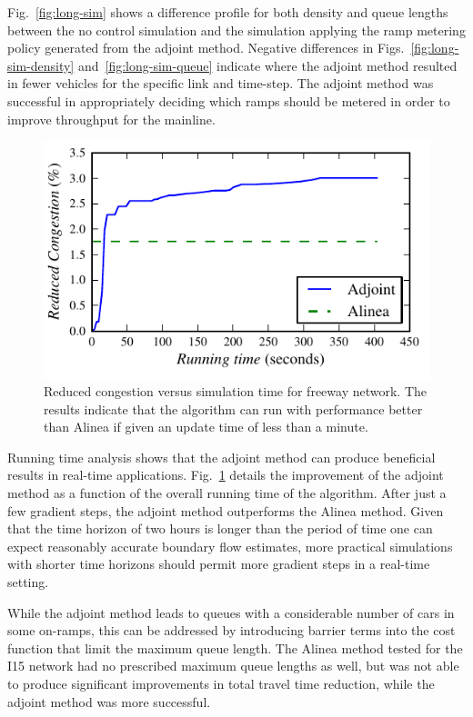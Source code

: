 						
Fig.~\ref{fig:long-sim} shows a difference profile for both density and queue lengths between the
no control simulation and the simulation applying the ramp metering
policy generated from the adjoint method. Negative differences in
Figs.~\ref{fig:long-sim-density} and~\ref{fig:long-sim-queue}
indicate where the adjoint method resulted in fewer vehicles for the
specific link and time-step. The adjoint method was successful in
appropriately deciding which ramps should be metered in order to improve
throughput for the mainline.
\begin{figure}
\begin{centering}
	\includegraphics[width=0.65\columnwidth]{images/longsim}
	\par\end{centering}
	\caption{Reduced congestion versus simulation time for freeway network. The results
		indicate that the algorithm can run with performance better than Alinea
		if given an update time of less than a minute.}\label{fig:running-time}
\end{figure}
								
								
Running time analysis shows that the adjoint method can produce beneficial
results in real-time applications. Fig.~\ref{fig:running-time} details the improvement of the adjoint method as a function of the overall running time of the algorithm. After just a few gradient steps, the
adjoint method outperforms the Alinea method. Given that the time
horizon of two hours is longer than the period of time one can expect
reasonably accurate boundary flow estimates, more practical simulations
with shorter time horizons should permit more gradient steps in a
real-time setting.
								
While the adjoint method leads to queues with a considerable number of cars in some on-ramps, this can be addressed by introducing barrier terms into the cost function that limit the
maximum queue length. The Alinea method tested for the I15 network
had no prescribed maximum queue lengths as well, but was not able
to produce significant improvements in total travel time reduction, while the adjoint method was
more successful.
								
